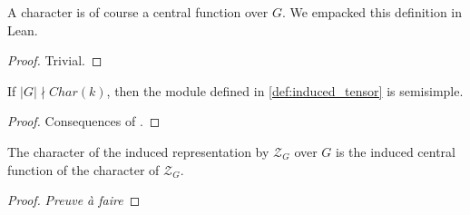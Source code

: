 \begin{definition}
    \label{def:char_central_fun}
    \leanok 
    A character is of course a central function over $G$. We empacked this definition
    in Lean.
    \begin{proof}
        \leanok
        Trivial.
    \end{proof}
\end{definition}

\begin{proposition}
    \label{prop:tensor_semi_simple}
    \leanok 
    If $|G|\nmid Char(k)$, then the module defined in \ref{def:induced_tensor} is semisimple.
\end{proposition}
\begin{proof}
    \leanok
    Consequences of .
\end{proof}


\begin{proposition}
    \label{prop:induced_char}
    \leanok 
    The character of the induced representation by $\mathcal{Z}_G$ over $G$ is the induced 
    central function of the character of $\mathcal{Z}_G$.
\end{proposition}
\begin{proof}
    \textit{Preuve à faire}
\end{proof}